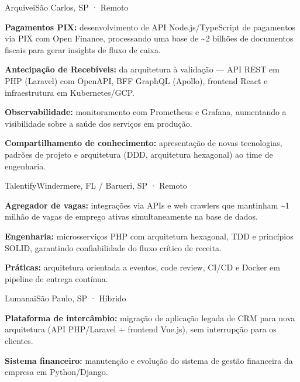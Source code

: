 \documentclass{resume}
\begin{document}
        {Arquivei}{São Carlos, SP · Remoto}
\begin{cvitems}
  \item \textbf{Pagamentos PIX:} desenvolvimento de API Node.js/TypeScript de pagamentos
        via PIX com Open Finance, processando uma base de \textasciitilde2 bilhões de
        documentos fiscais para gerar insights de fluxo de caixa.
  \item \textbf{Antecipação de Recebíveis:} da arquitetura à validação — API REST em PHP
        (Laravel) com OpenAPI, BFF GraphQL (Apollo), frontend React e infraestrutura em
        Kubernetes/GCP.
  \item \textbf{Observabilidade:} monitoramento com Prometheus e Grafana, aumentando a
        visibilidade sobre a saúde dos serviços em produção.
  \item \textbf{Compartilhamento de conhecimento:} apresentação de novas tecnologias,
        padrões de projeto e arquitetura (DDD, arquitetura hexagonal) ao time de engenharia.
\end{cvitems}

        {Talentify}{Windermere, FL / Barueri, SP · Remoto}
\begin{cvitems}
  \item \textbf{Agregador de vagas:} integrações via APIs e web crawlers que mantinham
        \textasciitilde1 milhão de vagas de emprego ativas simultaneamente na base de dados.
  \item \textbf{Engenharia:} microsserviços PHP com arquitetura hexagonal, TDD e
        princípios SOLID, garantindo confiabilidade do fluxo crítico de receita.
  \item \textbf{Práticas:} arquitetura orientada a eventos, code review, CI/CD e Docker
        em pipeline de entrega contínua.
\end{cvitems}

        {Lumanai}{São Paulo, SP · Híbrido}
\begin{cvitems}
  \item \textbf{Plataforma de intercâmbio:} migração de aplicação legada de CRM para nova
        arquitetura (API PHP/Laravel + frontend Vue.js), sem interrupção para os clientes.
  \item \textbf{Sistema financeiro:} manutenção e evolução do sistema de gestão financeira
        da empresa em Python/Django.
\end{cvitems}
\end{document}
